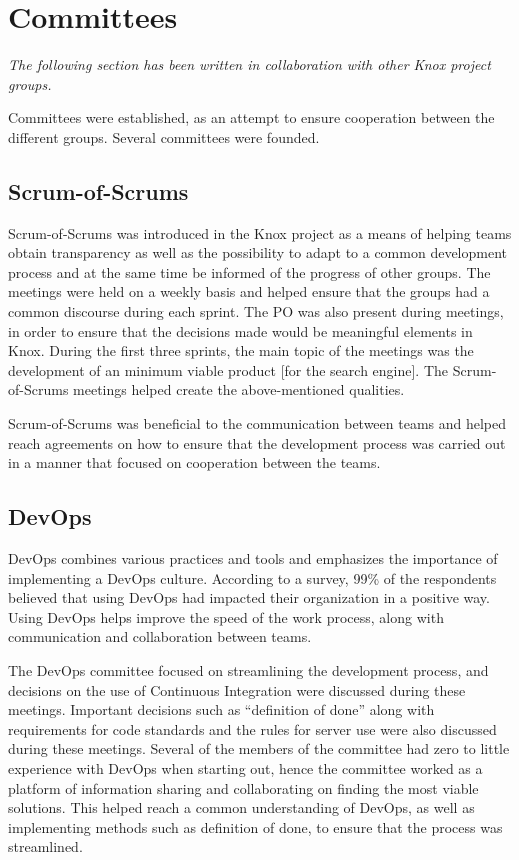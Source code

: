 \section{Committees}\label{SHARED-committees}
\textit{The following section has been written in collaboration with other Knox project groups.}

Committees were established, as an attempt to ensure cooperation between the different groups. Several committees were founded.

\subsection{Scrum-of-Scrums}
Scrum-of-Scrums was introduced in the Knox project as a means of helping teams obtain transparency as well as the possibility to adapt to a common development process and at the same time be informed of the progress of other groups\cite{agile}.
The meetings were held on a weekly basis and helped ensure that the groups had a common discourse during each sprint. 
The PO was also present during meetings, in order to ensure that the decisions made would be meaningful elements in Knox. 
During the first three sprints, the main topic of the meetings was the development of an minimum viable product [for the search engine].
The Scrum-of-Scrums meetings helped create the above-mentioned qualities.

Scrum-of-Scrums was beneficial to the communication between teams and helped reach agreements on how to ensure that the development process was carried out in a manner that focused on cooperation between the teams.

\subsection{DevOps}
DevOps combines various practices and tools and emphasizes the importance of implementing a DevOps culture. According to a survey, 99\% of the respondents believed that using DevOps had impacted their organization in a positive way\cite{Atlassian}. Using DevOps helps improve the speed of the work process, along with communication and collaboration between teams.

The DevOps committee focused on streamlining the development process, and decisions on the use of Continuous Integration were discussed during these meetings. 
Important decisions such as “definition of done” along with requirements for code standards and the rules for server use were also discussed during these meetings.
Several of the members of the committee had zero to little experience with DevOps when starting out, hence the committee worked as a platform of information sharing and collaborating on finding the most viable solutions. This helped reach a common understanding of DevOps, as well as implementing methods such as definition of done, to ensure that the process was streamlined.

